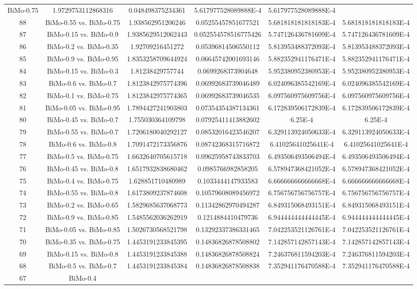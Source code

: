 \documentclass[a4paper,10pt]{article}
\begin{document}
\begin{landscape}
\begin{table}[!htp]
\begin{tabular}{cccccc}
BiMo-0.75&1.9729753112868316&0.048498375234361&5.617977528089888E-4&5.617977528089888E-4\\88&BiMo-0.55 vs. BiMo-0.75&1.938562951206246&0.05255457851677521&5.681818181818183E-4&5.681818181818183E-4\\87&BiMo-0.15 vs. BiMo-0.9&1.9385629512062443&0.052554578516775426&5.747126436781609E-4&5.747126436781609E-4\\86&BiMo-0.2 vs. BiMo-0.35&1.92709216451272&0.05396814506550112&5.813953488372093E-4&5.813953488372093E-4\\85&BiMo-0.9 vs. BiMo-0.95&1.8353258709644924&0.06645742001693146&5.882352941176471E-4&5.882352941176471E-4\\84&BiMo-0.15 vs. BiMo-0.3&1.81238429757744&0.0699268373904648&5.952380952380953E-4&5.952380952380953E-4\\83&BiMo-0.6 vs. BiMo-0.7&1.8123842975774396&0.06992683739046489&6.024096385542169E-4&6.024096385542169E-4\\82&BiMo-0.1 vs. BiMo-0.75&1.8123842975774365&0.06992683739046535&6.097560975609756E-4&6.097560975609756E-4\\81&BiMo-0.05 vs. BiMo-0.95&1.7894427241903803&0.07354354387134361&6.172839506172839E-4&6.172839506172839E-4\\80&BiMo-0.45 vs. BiMo-0.7&1.755030364109798&0.07925411413882602&6.25E-4&6.25E-4\\79&BiMo-0.55 vs. BiMo-0.7&1.7206180040292127&0.08532016423546207&6.329113924050633E-4&6.329113924050633E-4\\78&BiMo-0.6 vs. BiMo-0.8&1.7091472173356876&0.08742368315716872&6.41025641025641E-4&6.41025641025641E-4\\77&BiMo-0.5 vs. BiMo-0.75&1.6632640705615718&0.09625958743833703&6.493506493506494E-4&6.493506493506494E-4\\76&BiMo-0.45 vs. BiMo-0.8&1.6517932838680462&0.0985766982858205&6.578947368421052E-4&6.578947368421052E-4\\75&BiMo-0.4 vs. BiMo-0.75&1.628851710480989&0.1033444147933583&6.666666666666668E-4&6.666666666666668E-4\\74&BiMo-0.55 vs. BiMo-0.8&1.6173809237874608&0.10579608089456972&6.756756756756757E-4&6.756756756756757E-4\\73&BiMo-0.2 vs. BiMo-0.65&1.5829685637068773&0.11342862970494287&6.849315068493151E-4&6.849315068493151E-4\\72&BiMo-0.9 vs. BiMo-0.85&1.5485562036262919&0.1214884410479736&6.944444444444445E-4&6.944444444444445E-4\\71&BiMo-0.05 vs. BiMo-0.85&1.5026730568521798&0.13292337386331465&7.042253521126761E-4&7.042253521126761E-4\\70&BiMo-0.35 vs. BiMo-0.75&1.4453191233845395&0.14836826878508802&7.142857142857143E-4&7.142857142857143E-4\\69&BiMo-0.15 vs. BiMo-0.8&1.4453191233845388&0.14836826878508824&7.246376811594203E-4&7.246376811594203E-4\\68&BiMo-0.5 vs. BiMo-0.7&1.4453191233845384&0.14836826878508838&7.352941176470588E-4&7.352941176470588E-4\\67&BiMo-0.4 
\end{tabular}
\end{table}
\end{landscape}
\end{document}
